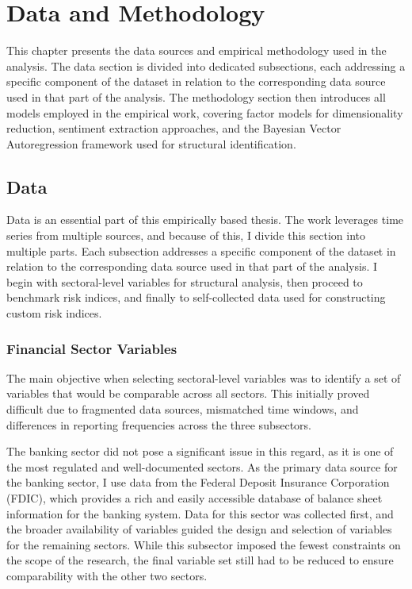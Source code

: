 \documentclass[12pt,a4paper]{report}
\begin{document}
\clearpage
\fancyhead[LO]{\sffamily\nouppercase{\leftmark}}
\chapter{Data and Methodology}
\label{chap:data}

This chapter presents the data sources and empirical methodology used in the analysis. The data section is divided into dedicated subsections, each addressing a specific component of the dataset in relation to the corresponding data source used in that part of the analysis. The methodology section then introduces all models employed in the empirical work, covering factor models for dimensionality reduction, sentiment extraction approaches, and the Bayesian Vector Autoregression framework used for structural identification.
\section{Data}

Data is an essential part of this empirically based thesis. The work leverages time series from multiple
sources, and because of this, I divide this section into multiple parts. Each subsection addresses a
specific component of the dataset in relation to the corresponding data source used in that part of
the analysis. I begin with sectoral-level variables for structural analysis, then proceed to benchmark risk indices, and
finally to self-collected data used for constructing custom risk indices.

\subsection{Financial Sector Variables}

The main objective when selecting sectoral-level variables was to identify a set of variables that
would be comparable across all sectors. This initially proved difficult due to fragmented data
sources, mismatched time windows, and differences in reporting frequencies across the three
subsectors.

The banking sector did not pose a significant issue in this regard, as it is one of the most
regulated and well-documented sectors. As the primary data source for the banking sector, I use data
from the Federal Deposit Insurance Corporation (FDIC), which provides a rich and easily accessible
database of balance sheet information for the banking system. Data for this sector was collected
first, and the broader availability of variables guided the design and selection of variables for
the remaining sectors. While this subsector imposed the fewest constraints on the scope of the
research, the final variable set still had to be reduced to ensure comparability with the other two
sectors.
\end{document}
